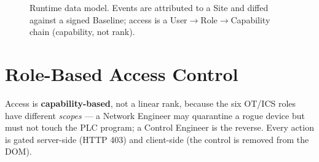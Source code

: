 \documentclass[11pt,a4paper]{article}
\newcommand{\enthead}[1]{\colorbox{navy}{\color{white}\bfseries\sffamily #1}}
\newcommand{\entrow}[1]{{\footnotesize\ttfamily\color{ink}#1}}
\begin{document}
\begin{figure}[h]
\caption{Runtime data model. Events are attributed to a Site and diffed against a signed Baseline;
access is a User$\to$Role$\to$Capability chain (capability, not rank).}
\label{fig:er}
\end{figure}

\section{Role-Based Access Control}
Access is \textbf{capability-based}, not a linear rank, because the six OT/ICS roles have different
\emph{scopes} --- a Network Engineer may quarantine a rogue device but must not touch the PLC
program; a Control Engineer is the reverse. Every action is gated server-side (HTTP 403) and
client-side (the control is removed from the DOM).
\end{document}
